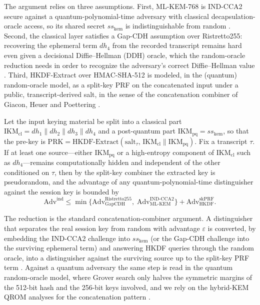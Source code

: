 \documentclass[conference]{IEEEtran}
\begin{document}
The argument relies on three assumptions. First, ML-KEM-768 is IND-CCA2 secure against a quantum-polynomial-time adversary with classical decapsulation-oracle access, so its shared secret $ss_{\mathrm{kem}}$ is indistinguishable from random \cite{fips203}. Second, the classical layer satisfies a Gap-CDH assumption over Ristretto255: recovering the ephemeral term $dh_4$ from the recorded transcript remains hard even given a decisional Diffie--Hellman (DDH) oracle, which the random-oracle reduction needs in order to recognize the adversary's correct Diffie--Hellman value \cite{devalence2024}. Third, HKDF-Extract over HMAC-SHA-512 is modeled, in the (quantum) random-oracle model, as a split-key PRF on the concatenated input under a public, transcript-derived salt, in the sense of the concatenation combiner of Giacon, Heuer and Poettering \cite{giacon2018}.

Let the input keying material be split into a classical part $\mathrm{IKM}_{\mathrm{cl}} = dh_1\|dh_2\|dh_3\|dh_4$ and a post-quantum part $\mathrm{IKM}_{\mathrm{pq}} = ss_{\mathrm{kem}}$, so that the pre-key is $\mathrm{PRK} = \mathrm{HKDF\text{-}Extract}(\mathrm{salt}_\tau,\, \mathrm{IKM}_{\mathrm{cl}}\|\mathrm{IKM}_{\mathrm{pq}})$. Fix a transcript $\tau$. If at least one source---either $\mathrm{IKM}_{\mathrm{pq}}$ or a high-entropy component of $\mathrm{IKM}_{\mathrm{cl}}$ such as $dh_4$---remains computationally hidden and independent of the other conditioned on $\tau$, then by the split-key combiner the extracted key is pseudorandom, and the advantage of any quantum-polynomial-time distinguisher against the session key is bounded by
\begin{equation}
\mathrm{Adv}^{\mathrm{ind}} \le
\min\!\bigl\{
\mathrm{Adv}_{\mathrm{GapCDH}}^{\mathrm{Ristretto255}},\;
\mathrm{Adv}_{\mathrm{ML\text{-}KEM}}^{\mathrm{IND\text{-}CCA2}}
\bigr\}
+ \mathrm{Adv}_{\mathrm{HKDF}}^{\mathrm{skPRF}}.
\label{eq:acit-comp-bound}
\end{equation}

The reduction is the standard concatenation-combiner argument. A distinguisher that separates the real session key from random with advantage $\varepsilon$ is converted, by embedding the IND-CCA2 challenge into $ss_{\mathrm{kem}}$ (or the Gap-CDH challenge into the surviving ephemeral term) and answering HKDF queries through the random oracle, into a distinguisher against the surviving source up to the split-key PRF term \cite{giacon2018,bindel2019}. Against a quantum adversary the same step is read in the quantum random-oracle model, where Grover search only halves the symmetric margins of the 512-bit hash and the 256-bit keys involved, and we rely on the hybrid-KEM QROM analyses for the concatenation pattern \cite{bindel2019}.
\end{document}
